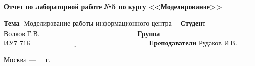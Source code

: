 \begin{titlepage}
	
	\begin{center}
		\Large\textbf{Отчет по лабораторной работе №5 по курсу <<Моделирование>>}
	\end{center}
	
	\noindent\newline\textbf{Тема} $\underline{\text{~Моделирование работы информационного центра~~~}}$\newline\newline
	\noindent\textbf{Студент} $\underline{\text{Волков Г.В.~~~~~~~~~~~~~~~~~~~~~~~~~~~~~~~~~~~~~~~~~~}}$\newline\newline
	\noindent\textbf{Группа} $\underline{\text{ИУ7-71Б~~~~~~~~~~~~~~~~~~~~~~~~~~~~~~~~~~~~~~~~~~~~~~~~~~~}}$\newline\newline
	\noindent\textbf{Преподаватели} \underline{Рудаков И.В.~~~~}\newline
	
	\begin{center}
		\vfill
		Москва~---~\the\year
		~г.
	\end{center}
 \restoregeometry
\end{titlepage}
